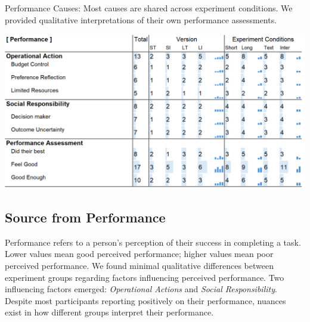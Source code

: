 \begin{table}[ht]
    \caption{Performance Causes: Most causes are shared across experiment conditions. We provided qualitative interpretations of their own performance assessments.}

    \label{tbl:physical}
    \includegraphics[width=0.95\linewidth]{content/image/cog/perf_table.png}
\end{table}

\subsection{Source from Performance}
\label{apdx:performance}

Performance refers to a person's perception of their success in completing a task. Lower values mean good perceived performance; higher values mean poor perceived performance. We found minimal qualitative differences between experiment groups regarding factors influencing perceived performance. Two influencing factors emerged: \textit{Operational Actions} and \textit{Social Responsibility}. Despite most participants reporting positively on their performance, nuances exist in how different groups interpret their performance.

